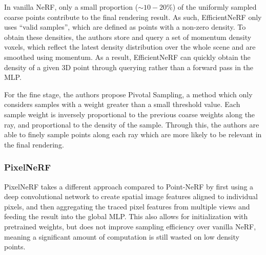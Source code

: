 \documentclass[10pt,twocolumn,letterpaper]{article}
\begin{document}
In vanilla NeRF, only a small proportion ($\sim 10-20\%$) of the uniformly sampled coarse points contribute to the final rendering result. As such, EfficientNeRF only uses “valid samples”, which are defined as points with a non-zero density. To obtain these densities, the authors store and query a set of momentum density voxels, which reflect the latest density distribution over the whole scene and are smoothed using momentum. As a result, EfficientNeRF can quickly obtain the density of a given 3D point through querying rather than a forward pass in the MLP. 

For the fine stage, the authors propose Pivotal Sampling, a method which only considers samples with a weight greater than a small threshold value. Each sample weight is inversely proportional to the previous coarse weights along the ray, and proportional to the density of the sample. Through this, the authors are able to finely sample points along each ray which are more likely to be relevant in the final rendering. 

\subsubsection{PixelNeRF}
PixelNeRF \cite{PixelNeRF} takes a different approach compared to Point-NeRF by first using a deep convolutional network to create spatial image features aligned to individual pixels, and then aggregating the traced pixel features from multiple views and feeding the result into the global MLP. This also allows for initialization with pretrained weights, but does not improve sampling efficiency over vanilla NeRF, meaning a significant amount of computation is still wasted on low density points.
\end{document}
